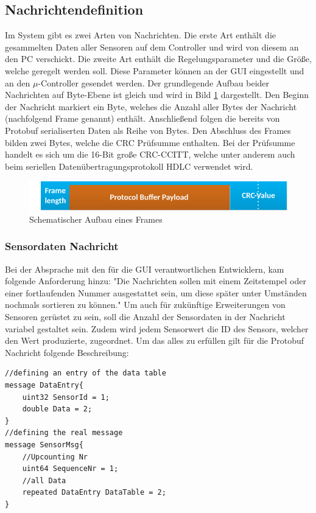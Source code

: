 \subsection{Nachrichtendefinition}
Im System gibt es zwei Arten von Nachrichten. Die erste Art enthält die gesammelten Daten aller Sensoren auf dem Controller und wird von diesem an den PC verschickt. Die zweite Art enthält die Regelungsparameter und die Größe, welche geregelt werden soll. Diese Parameter können an der GUI eingestellt und an den $\mu$-Controller gesendet werden. Der grundlegende Aufbau beider Nachrichten auf Byte-Ebene ist gleich und wird in Bild \ref{fig:FrameOv} dargestellt. Den Beginn der Nachricht markiert ein Byte, welches die Anzahl aller Bytes der Nachricht (nachfolgend Frame genannt) enthält. Anschließend folgen die bereits von Protobuf serialiserten Daten als Reihe von Bytes. Den Abschluss des Frames bilden zwei Bytes, welche die CRC Prüfsumme enthalten. Bei der Prüfsumme handelt es sich um die 16-Bit große CRC-CCITT, welche unter anderem auch beim seriellen Datenübertragungsprotokoll HDLC verwendet wird. \cite[Absatz 1]{hdlcCrc}
\begin{figure}[h]
  \includegraphics[width=\textwidth]{MessageFormat}
  \caption{Schematischer Aufbau eines Frames}
  \label{fig:FrameOv}
\end{figure}
\subsubsection{Sensordaten Nachricht}
Bei der Absprache mit den für die GUI verantwortlichen Entwicklern, kam folgende Anforderung hinzu: "Die Nachrichten sollen mit einem Zeitstempel oder einer fortlaufenden Nummer ausgestattet sein, um diese später unter Umständen nochmals sortieren zu können." Um auch für zukünftige Erweiterungen von Sensoren gerüstet zu sein, soll die Anzahl der Sensordaten in der Nachricht variabel gestaltet sein. Zudem wird jedem Sensorwert die ID des Sensors, welcher den Wert produzierte, zugeordnet. Um das alles zu erfüllen gilt für die Protobuf Nachricht folgende Beschreibung:
\begin{lstlisting}[caption=Beschreibung der Sensordaten Nachricht, label=lst:protoData]
//defining an entry of the data table
message DataEntry{
	uint32 SensorId = 1;
	double Data = 2;
}
//defining the real message
message SensorMsg{
	//Upcounting Nr
	uint64 SequenceNr = 1;
	//all Data
	repeated DataEntry DataTable = 2;
}
\end{lstlisting}
